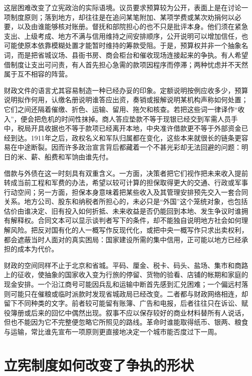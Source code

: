这层困难改变了立宪政治的实际语境。议员要求预算较为公开，表面上是在讨论一项制度原则；落到地方，却往往是在追问某笔附加、某项学费或某次劝捐何以必要，以及由谁能够核对账册。督抚和部院担心的也不只是批评本身。他们须在紧急支出、上级考成、地方不满与信用维持之间安排顺序，公开说明可以增加信任，也可能使原本依靠模糊处置才能暂时维持的筹款受阻。于是，预算权并非一个抽象名词，而是把省城议场、县衙书房、商会柜台和催收现场连接起来的争执。有人希望借制度让支出可问责，有人首先担心急需的款项因程序而停滞；两种忧虑并不天然属于互不相容的阵营。

财政文件的语言尤其容易制造一种已经办妥的印象。定额说明按例应收多少，预算说明拟作何用，认缴名册说明谁答应出资，奏销或报解说明某机构声称如何处置；它们之间还隔着催缴、折色、运输、留用、拖欠和核查。若把这些词一律译作“收入”，便会把危机的时间性抹掉。商人答应垫款不等于现银已经交到军需人员手中，税局开具收据也不等于款项已经离开本地，中央准许借款更不等于外部资金已经到达。1911年之后，政权名义和军队归属都在变化，这些本来就很长的链条更容易在中途断裂。因而许多政治宣言背后都藏着一个不甚光彩却无法回避的问题：明日的米、薪、船费和军饷由谁先付。

借款与外债在这一时刻具有双重含义。一方面，决策者把它们视作把未来收入提前转成当前工程和军费的办法，希望以较可计算的担保取得更大的交通、行政或军事行动空间；另一方面，担保本身意味着把某些收入及其管理安排预先交入一套合同关系。地方公司、股东和纳税者所担心的，未必只是“外国”这个笼统对象，也包括估价由谁决定、旧有投入如何折抵、未来收益是否仍能回到本地、发生争议时谁拥有解释权。合同文本可以显示谈判者写下的条件，却不能独自说明地方社会如何理解风险。把反对国有化的人一概写作反现代化，或把中央一概写作只求出卖权利，都会遮蔽当时人面对的真实困局：国家建设所需的集中信用，正可能以地方已经承担的成本为代价。

财政的空间同样不止于北京和省城。平码、厘金、税卡、码头、盐场、集市和商路上的征收，使抽象的国家收入变为行旅的停留、货物的验看、店铺的帐期和家庭的现金安排。一个沿江商号可能因兵乱和运输中断首先感到汇兑困难；一个偏远村落则可能只在催粮或临时派款时发现省城政局已经改变。二者都与财政网络相连，却留下不同种类的文字。前者较可能留有账簿、广告和电报，后者往往只在诉讼、赋役簿册或后来的回忆中偶然出现。叙事不应以保存较好的商业材料替所有人说话，但也不能因为它不完整便忽略它所照见的路线。革命时谁能取得纸币、银两、粮食与运输，常比谁先宣布一项原则更直接地决定一个城市能否度过下一周。

\section{立宪制度如何改变了争执的形状}

